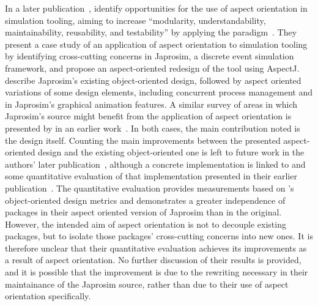 In a later publication~\cite{chibani2019using}, \citeauthor{chibani2019using}
identify opportunities for the use of aspect orientation in simulation tooling,
aiming to increase ``modularity, understandability, maintainability,
reusability, and testability'' by applying the paradigm~\cite{chibani2019using}.
They present a case study of an application of aspect orientation to simulation
tooling by identifying cross-cutting concerns in Japrosim, a discrete event
simulation framework, and propose an aspect-oriented redesign of the tool using
AspectJ. \citeauthor{chibani2019using} describe Japrosim's existing
object-oriented design, followed by aspect oriented variations of some design
elements, including concurrent process management and in Japrosim's graphical
animation features. A similar survey of areas in which Japrosim's source might
benefit from the application of aspect orientation is presented by
\citeauthor{chibani2014practical} in an earlier
work~\cite{chibani2014practical}. In both cases, the main contribution noted is
the design itself. Counting the main improvements between the presented
aspect-oriented design and the existing object-oriented one is left to future
work in the authors' later publication~\cite{chibani2019using}, although a
concrete implementation is linked to and some quantitative evaluation of that
implementation presented in their earlier
publication~\cite{chibani2014practical}. The quantitative evaluation provides
measurements based on \citeauthor{martin1994oo}'s object-oriented design metrics
and demonstrates a greater independence of packages in their aspect oriented
version of Japrosim than in the original. However, the intended aim of aspect
orientation is not to decouple existing packages, but to isolate those packages'
cross-cutting concerns into new ones. It is therefore unclear that their
quantitative evaluation achieves its improvements as a result of aspect
orientation. No further discussion of their results is provided, and it is
possible that the improvement is due to the rewriting necessary in their
maintainance of the Japrosim source, rather than due to their use of aspect
orientation specifically.

